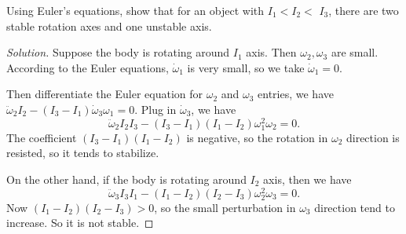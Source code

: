 \begin{problem}
	Using Euler's equations, show that for an object with $I_1<I_2<$ $I_3$, there are two stable rotation axes and one unstable axis.
\end{problem}
\begin{proof}[Solution]
	Suppose the body is rotating around $I_1$ axis. Then $\omega_2, \omega_3$ are small. According to the Euler equations, $\dot{\omega}_1$ is very small, so we take $\dot{\omega}_1 = 0$.

	Then differentiate the Euler equation for $\omega_2$ and $\omega_3$ entries, we have $\ddot{\omega} _2 I_2 - (I_3 - I_1) \dot{\omega}_3 \omega_1 = 0$. Plug in $\dot{\omega}_3$, we have
	\[
		\ddot{\omega} _2 I_2 I_3 - (I_3 - I_1) (I_1 - I_2) \omega_1^2 \omega_2 = 0
	.\] 
	The coefficient $(I_3 - I_1)(I_1 - I_2)$ is negative, so the rotation in $\omega_2$ direction is resisted, so it tends to stabilize. 

	On the other hand, if the body is rotating around $I_2$ axis, then we have
	\[
		\ddot{\omega} _3 I_3 I_1 - (I_1 - I_2) (I_2 - I_3) \omega_2^2 \omega_3 = 0
	.\] 
	Now $(I_1 - I_2)(I_2 - I_3) > 0$, so the small perturbation in $\omega_3$ direction tend to increase. So it is not stable.
\end{proof}


